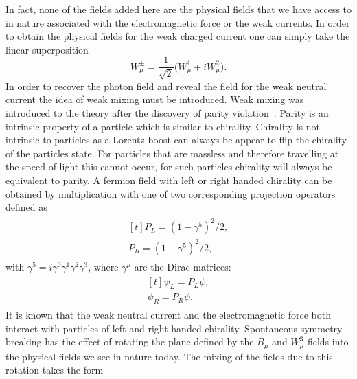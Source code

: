 In fact, none of the fields added here are the physical fields that we have
access to in nature associated with the electromagnetic force or the weak
currents. In order to obtain the physical fields for the weak charged current
one can simply take the linear superposition
\begin{equation}
  \label{eq:weak-charged-current} W_\mu^\pm = \frac{1}{\sqrt{2}}\big(W_\mu^{1}
\mp iW_\mu^2\big).
\end{equation} In order to recover the photon field and reveal the field for the
weak neutral current the idea of weak mixing must be introduced. Weak mixing was
introduced to the theory after the discovery of parity
violation~\cite{wu-parity}. Parity is an intrinsic property of a particle which
is similar to chirality. Chirality is not intrinsic to particles as a Lorentz
boost can always be appear to flip the chirality of the particles state. For
particles that are massless and therefore travelling at the speed of light this
cannot occur, for such particles chirality will always be equivalent to parity.
A fermion field with left or right handed chirality can be obtained by
multiplication with one of two corresponding projection operators defined as
\begin{equation}
  \begin{split}
    \begin{aligned}[t] P_L = {(1 - \gamma^{5})}^{2} / 2, \\ P_R = {(1 +
\gamma^{5})}^{2} / 2,
    \end{aligned}
  \end{split}
\end{equation} with $\gamma^{5} = i\gamma^{0}\gamma^{1}\gamma^{2}\gamma^{3}$,
where $\gamma^{\mu}$ are the Dirac matrices:
\begin{equation}
  \label{eq:chiral-fermions}
  \begin{split}
    \begin{aligned}[t] \psi_{L} = P_{L}\psi,\\ \psi_{R} = P_{R}\psi.
    \end{aligned}
  \end{split}
\end{equation} It is known that the weak neutral current and the electromagnetic
force both interact with particles of left and right handed chirality.
Spontaneous symmetry breaking has the effect of rotating the plane defined by
the $B_\mu$ and $W_\mu^3$ fields into the physical fields we see in nature
today. The mixing of the fields due to this rotation takes the form
